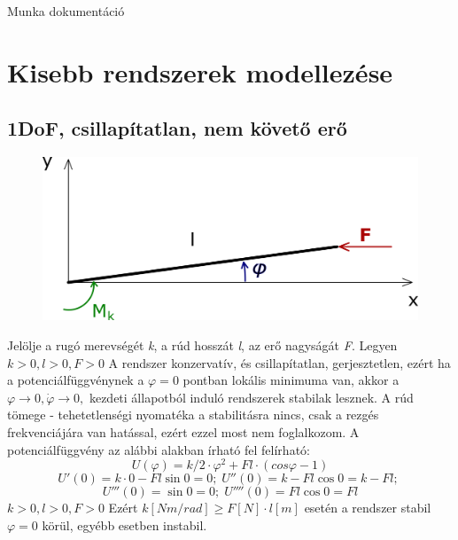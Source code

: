 \documentclass[12pt,twoside]{article}
\begin{document}
Munka dokumentáció 

 \section{Kisebb rendszerek modellezése }
 
\subsection{1DoF, csillapítatlan, nem követő erő} %
\begin{figure}[H]
\center
\includegraphics[scale=1]{1szab_nem_koveto}
\end{figure}
 Jelölje a rugó merevségét \emph{k}, a rúd hosszát \emph{l}, az erő nagyságát \emph{F}. Legyen $  k>0, l>0, F>0 $  \newline
 A rendszer konzervatív, és csillapítatlan, gerjesztetlen, ezért ha a potenciálfüggvénynek a $  \varphi =0 $ pontban lokális minimuma van, akkor a $  \varphi \rightarrow 0,  \dot \varphi \rightarrow 0, $ kezdeti állapotból induló rendszerek stabilak lesznek. A rúd tömege - tehetetlenségi nyomatéka a stabilitásra nincs, csak a rezgés frekvenciájára van hatással, ezért ezzel most nem foglalkozom. \newline
A potenciálfüggvény az alábbi alakban írható fel felírható:
\begin{equation} \label{eq:Newton}
U(\varphi)=k/2 \cdot \varphi ^2 + F l \cdot ( cos\varphi-1)
\end{equation}
 \begin{equation} \label{eq:Newton}
U'(0)=k \cdot 0 - F l \sin0=0 ; \;
U''(0)=k  - F l \cos0=k-Fl ; \;
\end{equation}
\begin{equation} \label{eq:Newton}
U'''(0)=\sin0=0;\;
U''''(0)=Fl\cos0=Fl
\end{equation}
$  k>0, l>0, F>0 $ Ezért $  k [Nm/rad]\geq F[N] \cdot l [m] $ esetén a rendszer stabil $  \varphi =0 $ körül, egyébb esetben instabil.
\end{document}
